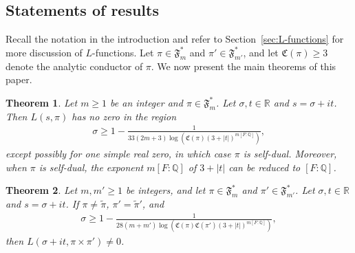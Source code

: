 \documentclass[12pt,reqno]{amsart}
\renewcommand{\tilde}{\widetilde}
\newtheorem{thm}{Theorem}[section]
\theoremstyle{remark}
\renewcommand{\tilde}{\widetilde}
\renewcommand{\tilde}{\widetilde}
\newcommand{\Q}{\mathbb{Q}}
\numberwithin{equation}{section}
\begin{document}
	



\subsection{Statements of results}
Recall the notation in the introduction and refer to Section~\ref{sec:L-functions} for more discussion of $L$-functions.  
Let $\pi \in \mathfrak{F}_m^*$ and $\pi' \in \mathfrak{F}_{m'}^*$, and let $\mathfrak{C}(\pi)\geq 3$ denote the analytic conductor of $\pi$. We now present the main theorems of this paper. %
	
	\begin{thm}
		\label{thm1:ZFR-cuspforms}
		Let $m \ge 1$ be an integer and $\pi \in \mathfrak{F}^*_m$. Let $\sigma,t\in\mathbb{R}$ and $s= \sigma+it$. Then $L(s, \pi)$ has no zero in the region
		\begin{equation*}
			\begin{aligned}
				\sigma 
				\ge 1- \frac{1}{33(2m+3)\log(\mathfrak{C}(\pi) (3+|t|)^{m[F:\Q]})},
			\end{aligned}
		\end{equation*}
		except possibly for one simple real zero, in which case $\pi$ is self-dual. Moreover, when $\pi$ is self-dual, the exponent $m[F:\Q]$ of $3+|t|$ can be reduced to $[F:\Q]$.
	\end{thm}
	\begin{thm}
		\label{thm1:ZFR-rankin-selberg}
		Let $m, m' \ge 1$ be integers, and  let $\pi \in \mathfrak{F}^*_m$ and $\pi' \in \mathfrak{F}^*_{m'}$.
		Let $\sigma,t\in\mathbb{R}$ and $s= \sigma+it$. If  $\pi\neq\tilde{\pi}$, $\pi'=\tilde{\pi}'$, and
		\begin{equation*}
			\begin{aligned}
				\sigma 
				\ge 1- \frac{1}{28(m+m')\log(\mathfrak{C}(\pi) \mathfrak{C}(\pi')(3+|t|)^{m[F:\Q]})},
			\end{aligned}
		\end{equation*}
		then $L(\sigma+it,\pi \times \pi')\neq 0$. %
	\end{thm}
	
\end{document}

